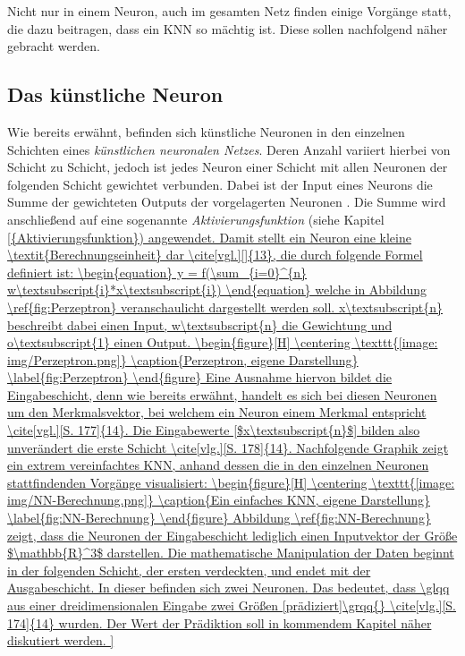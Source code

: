 Nicht nur in einem Neuron, auch im gesamten Netz finden einige Vorgänge statt, die dazu beitragen, dass ein KNN so mächtig ist. Diese sollen nachfolgend näher gebracht werden.


\subsection{Das künstliche Neuron} \label{Neuron}
Wie bereits erwähnt, befinden sich künstliche Neuronen in den einzelnen Schichten eines \textit{künstlichen neuronalen Netzes}. Deren Anzahl variiert hierbei von Schicht zu Schicht, jedoch ist jedes Neuron einer Schicht mit allen Neuronen der folgenden Schicht gewichtet verbunden. Dabei ist der Input eines Neurons die Summe der gewichteten Outputs der vorgelagerten Neuronen \cite[vlg.][]{17}. Die Summe wird anschließend auf eine sogenannte \textit{Aktivierungsfunktion} (siehe Kapitel \ref{{Aktivierungsfunktion}) angewendet.
Damit stellt ein Neuron eine kleine \textit{Berechnungseinheit} dar \cite[vgl.][]{13}, die durch folgende Formel definiert ist:

\begin{equation}
y = f(\sum_{i=0}^{n} w\textsubscript{i}*x\textsubscript{i})
\end{equation} 

welche in Abbildung \ref{fig:Perzeptron} veranschaulicht dargestellt werden soll. x\textsubscript{n} beschreibt dabei einen Input, w\textsubscript{n} die Gewichtung und o\textsubscript{1} einen Output. 

\begin{figure}[H]
	\centering
	\texttt{[image: img/Perzeptron.png]}
	\caption{Perzeptron, eigene Darstellung}
	\label{fig:Perzeptron}
\end{figure}

Eine Ausnahme hiervon bildet die Eingabeschicht, denn wie bereits erwähnt, handelt es sich bei diesen Neuronen um den Merkmalsvektor, bei welchem ein Neuron einem Merkmal entspricht \cite[vgl.][S. 177]{14}. 
Die Eingabewerte [$x\textsubscript{n}$] bilden also unverändert die erste Schicht \cite[vlg.][S. 178]{14}. Nachfolgende Graphik zeigt ein extrem vereinfachtes KNN, anhand dessen die in den einzelnen Neuronen stattfindenden Vorgänge visualisiert:
\begin{figure}[H]
	\centering
	\texttt{[image: img/NN-Berechnung.png]}
	\caption{Ein einfaches KNN, eigene Darstellung}
	\label{fig:NN-Berechnung}
\end{figure}
Abbildung \ref{fig:NN-Berechnung} zeigt, dass die Neuronen der Eingabeschicht lediglich einen Inputvektor der Größe $\mathbb{R}^3$ darstellen. Die mathematische Manipulation der Daten beginnt in der folgenden Schicht, der ersten verdeckten, und endet mit der Ausgabeschicht. In dieser befinden sich zwei Neuronen. Das bedeutet, dass \glqq aus einer dreidimensionalen Eingabe zwei Größen [prädiziert]\grqq{} \cite[vlg.][S. 174]{14} wurden. Der Wert der Prädiktion soll in kommendem Kapitel näher diskutiert werden.

}
